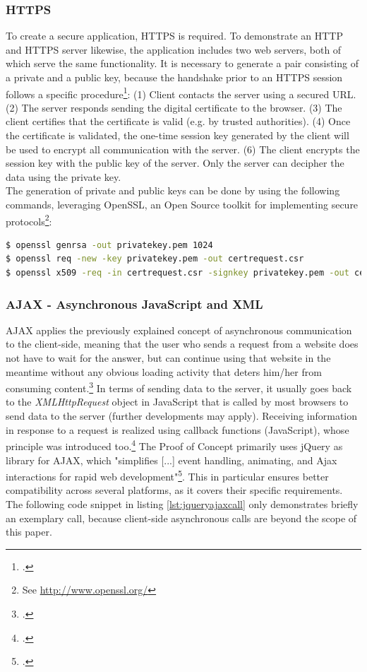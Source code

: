 \subsubsection{HTTPS}
To create a secure application, HTTPS is required. To demonstrate an HTTP and
HTTPS server likewise, the application includes two web servers, both of which
serve the same functionality. It is necessary to generate a pair consisting of a
private and a public key, because the handshake prior to an HTTPS session
follows a specific procedure\footcite[Cf.][]{Nemati_2011}:
 (1) Client contacts the server using a secured URL.
 (2) The server responds sending the digital certificate to the browser.
 (3) The client certifies that the certificate is valid (e.g. by trusted
 authorities).
 (4) Once the certificate is validated, the one-time session key generated by
 the client will be used to encrypt all communication with the server.
 (6) The client encrypts the session key with the public key of the server. Only
 the server can decipher the data using the private key.\\
The generation of private and public keys can be done by using the following
commands, leveraging OpenSSL, an Open Source toolkit for implementing secure
protocols\footnote{See \url{ http://www.openssl.org/}}:\\

\begin{lstlisting}[language=bash,
morekeywords={openssl},
caption={Generating a new pair of public/private keys},
label={lst:openssl}]
$ openssl genrsa -out privatekey.pem 1024
$ openssl req -new -key privatekey.pem -out certrequest.csr 
$ openssl x509 -req -in certrequest.csr -signkey privatekey.pem -out certificate.pem
\end{lstlisting}%

\subsubsection{AJAX - Asynchronous JavaScript and XML}
AJAX applies the previously explained concept of asynchronous communication to
the client-side, meaning that the user who sends a request from a website does
not have to wait for the answer, but can continue using that website in the
meantime without any obvious loading activity that deters him/her from consuming
content.\footcite[Cf.][46]{riordan2008head} In terms of sending data to the
server, it usually goes back to the \textit{XMLHttpRequest} object in JavaScript that is
called by most browsers to send data to the server (further developments may
apply). Receiving information in response to a request is realized using
callback functions (JavaScript), whose principle was introduced
too.\footcite[Cf.][21]{riordan2008head} The Proof of Concept primarily uses
jQuery as library for AJAX, which "simplifies [...] event handling, animating,
and Ajax interactions for rapid web development"\footcite[Cf.][]{jquery2013}.
This in particular ensures better compatibility across several platforms, as it
covers their specific requirements. The following code snippet in listing
\ref{lst:jqueryajaxcall} only demonstrates briefly an exemplary call, because
client-side asynchronous calls are beyond the scope of this paper.

